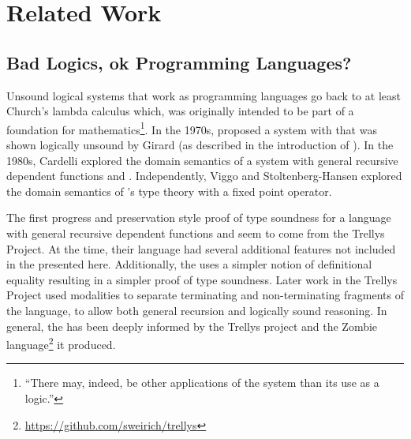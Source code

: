 \section{Related Work}
 
\subsection{Bad Logics, ok Programming Languages?}
 
Unsound logical systems that work as programming languages go back to at least Church's lambda calculus which, was originally intended to be part of a foundation for mathematics\footnote{
  ``There may, indeed, be other applications of the system than its use as a logic.''\cite[p.349]{10.2307/1968337}
}.
In the 1970s, \MartinL{} proposed a system with \tit{}\cite{Martin-Lof-1971} that was shown logically unsound by Girard (as described in the introduction of \cite{Martin-Lof-1972}).
In the 1980s, Cardelli explored the domain semantics of a system with general recursive dependent functions and \tit{}\cite{cardelli1986polymorphic}.
Independently, Viggo and Stoltenberg-Hansen\cite{PALMGREN1990135} explored the domain semantics of \MartinL{}'s type theory with a fixed point operator.

The first progress and preservation style proof of type soundness for a language with general recursive dependent functions and \tit{} seem to come from the Trellys Project\cite{sjoberg2012irrelevance}.
At the time, their language had several additional features not included in the \slang{} presented here.
Additionally, the \slang{} uses a simpler notion of definitional equality resulting in a simpler proof of type soundness.
Later work in the Trellys Project\cite{casinghino2014combining,casinghino2014combiningthesis} used modalities to separate terminating and non-terminating fragments of the language, to allow both general recursion and logically sound reasoning. %
In general, the \slang{} has been deeply informed by the Trellys project\cite{sjoberg2012irrelevance,casinghino2014combining,casinghino2014combiningthesis,sjoberg2015programming,sjoberg2015dependently} and the Zombie language\footnote{
  \url{https://github.com/sweirich/trellys}
} it produced.
 
 
